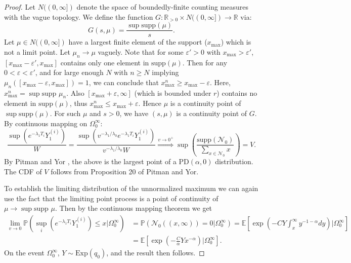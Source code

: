 \documentclass{article}
\numberwithin{equation}{section}
\begin{document}
\begin{proof}
Let $N((0,\infty])$ denote the space of boundedly-finite counting measures with the vague topology. We define the function $G:\mathbb{R}_{>0}\times N((0,\infty])\to \mathbb{R}$ via:
\[
G(s,\mu)=\frac{\sup\text{supp}(\mu)}{s}.
\]
Let $\mu\in N((0,\infty])$ have a largest finite element of the support ($x_{\max}$) which is not a limit point. Let $\mu_n\to\mu$ vaguely. Note that for some $\varepsilon'>0$ with $x_{\max}>\varepsilon'$, $[x_{\max}-\varepsilon',x_{\max}]$ contains only one element in $\text{supp}(\mu)$. Then for any $0<\varepsilon<\varepsilon'$, and for large enough $N$ with $n\geq N$ implying $\mu_n([x_{\max}-\varepsilon,x_{\max}])=1$, we can conclude that $x_{\max}^n\geq x_{\max}-\varepsilon$. Here, $x_{\max}^n=\sup\text{supp }\mu_n$. Also $[x_{\max}+\varepsilon,\infty]$ (which is bounded under $r$) contains no element in $\text{supp}(\mu)$, thus $x_{\max}^n \leq x_{\max}+\varepsilon$. Hence $\mu$ is a continuity point of $\sup\text{supp}(\mu)$. For such $\mu$ and $s>0$, we have $(s,\mu)$ is a continuity point of $G$. By continuous mapping on $\Omega_0^\infty$:
\[
\frac{\sup\left(e^{-\lambda_1 T_i}Y_1^{(i)}\right)}{W}=\frac{\sup\left(v^{-\lambda_1/\lambda_0}e^{-\lambda_1 T_i}Y_1^{(i)}\right)}{v^{-\lambda_1/\lambda_0}W}\overset{v\to 0^+}{\Rightarrow} \sup\left(\frac{\text{supp}(\mathcal{N}_0)}{\sum_{x\in \mathcal{N}_0}x}\right)=V.
\]
By Pitman and Yor \cite{pitman1997}, the above is the largest point of a $\text{PD}(\alpha,0)$ distribution. The CDF of $V$ follows from Proposition 20 of Pitman and Yor.

To establish the limiting distribution of the unnormalized maximum we can again use the fact that the limiting point process is a point of continuity of $\mu\to \sup\text{supp }\mu$. Then by the continuous mapping theorem we get
\begin{align*}
\lim_{v\to 0}\mathbb{P}(\sup_i(e^{-\lambda_1 T_i}Y_1^{(i)})\leq x|\Omega_0^\infty)&=\mathbb{P}(\mathcal{N}_0((x,\infty))=0|\Omega_0^\infty)=\mathbb{E}\left[\exp\left(-CY\int_{x}^\infty y^{-1-\alpha}dy\right)|\Omega_0^\infty\right]\\
&=
\mathbb{E}\left[\exp\left(-\frac{C}{\alpha}Yx^{-\alpha}\right)|\Omega_0^\infty\right].
\end{align*}
On the event $\Omega_0^\infty$, $Y\sim \text{Exp}(q_0)$, and the result then follows.

\end{proof}
\end{document}
